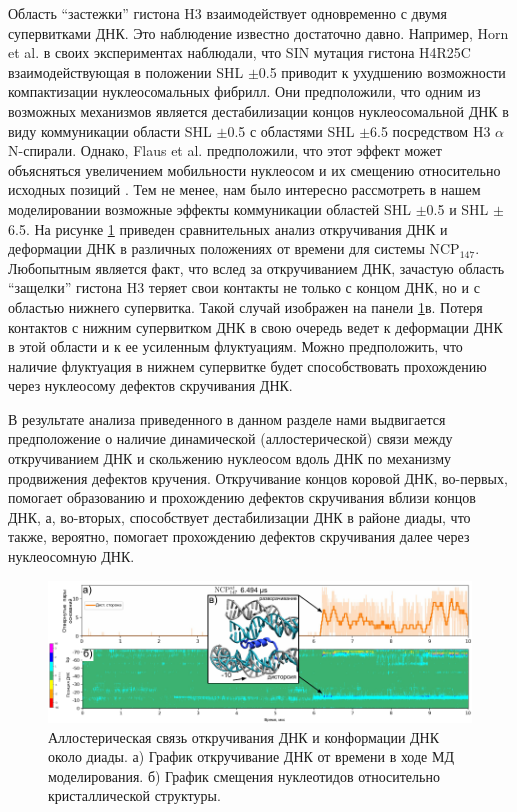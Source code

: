 Область ``застежки'' гистона H3 взаимодействует одновременно с двумя супервитками ДНК. Это наблюдение известно достаточно давно. Например, Horn et al. в своих экспериментах наблюдали, что SIN мутация гистона H4R25C взаимодействующая в положении SHL $\pm$0.5 приводит к ухудшению возможности компактизации нуклеосомальных фибрилл. Они предположили, что одним из возможных механизмов является дестабилизации концов нуклеосомальной ДНК в виду коммуникации области SHL $\pm$0.5 с областями SHL $\pm$6.5 посредством H3 $\alpha$N-спирали. Однако, Flaus et al. предположили, что этот эффект может объясняться увеличением мобильности нуклеосом и их смещению относительно исходных позиций \cite{flaus_sin_2004}. Тем не менее, нам было интересно рассмотреть в нашем моделировании возможные эффекты коммуникации областей SHL $\pm$0.5 и SHL $\pm$6.5. На рисунке \ref{fig:p2_3:f9} приведен сравнительных анализ откручивания ДНК и деформации ДНК в различных положениях от времени для системы NCP$_{147}$. Любопытным является факт, что вслед за откручиванием ДНК, зачастую область ``защелки'' гистона H3 теряет свои контакты не только с концом ДНК, но и с областью нижнего супервитка.
Такой случай изображен на панели \ref{fig:p2_3:f9}в. Потеря контактов с нижним супервитком ДНК в свою очередь ведет к деформации ДНК в этой области и к ее усиленным флуктуациям. Можно предположить, что наличие флуктуация в нижнем супервитке будет способствовать прохождению через нуклеосому дефектов скручивания ДНК.

В результате анализа приведенного в данном разделе нами выдвигается предположение о наличие динамической (аллостерической) связи между откручиванием ДНК и скольжению нуклеосом вдоль ДНК по механизму продвижения дефектов кручения. Откручивание концов коровой ДНК, во-первых, помогает образованию и прохождению дефектов скручивания вблизи концов ДНК, а, во-вторых, способствует дестабилизации ДНК в районе диады, что также, вероятно, помогает прохождению дефектов скручивания далее через нуклеосомную ДНК.



\begin{figure} [H]
    \centering
    \includegraphics[width=\textwidth]{images/p2/10ms/fig9.pdf}
    \caption[Аллостерическая связь откручивания ДНК и конформации ДНК около диады]{Аллостерическая связь откручивания ДНК и конформации ДНК около диады. а) График откручивание ДНК от времени в ходе МД моделирования. б) График смещения нуклеотидов относительно кристаллической структуры.}
    \label{fig:p2_3:f9}
\end{figure}






